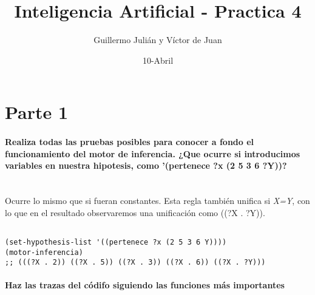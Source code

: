 \documentclass[nochap]{apuntes}
\author{Guillermo Julián y Víctor de Juan}
\date{10-Abril}
\title{Inteligencia Artificial - Practica 4}
\begin{document}
\maketitle
\section*{Parte 1}

\paragraph{Realiza todas las pruebas posibles para conocer a fondo el funcionamiento del motor de inferencia. ¿Que ocurre si introducimos variables en nuestra hipotesis, como '(pertenece ?x (2 5 3 6 ?Y))?\\\\}

Ocurre lo mismo que si fueran constantes. Esta regla también unifica si \textit{X=Y}, con lo que en el resultado observaremos una unificación como ((?X . ?Y)).\\

\begin{lstlisting}[frame=single]

(set-hypothesis-list '((pertenece ?x (2 5 3 6 Y))))
(motor-inferencia)
;; (((?X . 2)) ((?X . 5)) ((?X . 3)) ((?X . 6)) ((?X . ?Y)))
\end{lstlisting}

\paragraph{Haz las trazas del códifo siguiendo las funciones más importantes}
\end{document}
